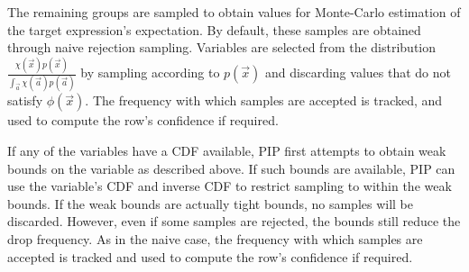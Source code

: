 The remaining groups are sampled to obtain values for Monte-Carlo estimation of the target expression's expectation.  By default, these samples are obtained through naive rejection sampling.  Variables are selected from the distribution $\frac{\chi(\vec{x})p(\vec{x})}{\int_{\vec{a}} \chi(\vec{a})p(\vec{a})}$ by sampling according to $p(\vec{x})$ and discarding values that do not satisfy $\phi(\vec{x})$.  The frequency with which samples are accepted is tracked, and used to compute the row's confidence if required.

If any of the variables have a CDF available, PIP first attempts to obtain weak bounds on the variable as described above.  If such bounds are available, PIP can use the variable's CDF and inverse CDF to restrict sampling to within the weak bounds.  If the weak bounds are actually tight bounds, no samples will be discarded.  However, even if some samples are rejected, the bounds still reduce the drop frequency.  As in the naive case, the frequency with which samples are accepted is tracked and used to compute the row's confidence if required.

